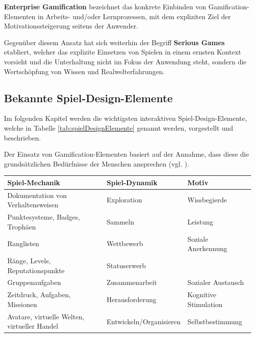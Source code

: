 \documentclass[bibliography=totoc,listof=totoc,BCOR=5mm,DIV=12,oneside]{scrbook}
\begin{document}
\par \bigskip \textbf{Enterprise Gamification} bezeichnet das konkrete Einbinden von Gamification-Elementen in Arbeits- und/oder Lernprozessen, mit dem expliziten Ziel der Motivationssteigerung seitens der Anwender.
\par \bigskip Gegenüber diesem Ansatz hat sich weiterhin der Begriff \textbf{Serious Games} etabliert, welcher das explizite Einsetzen von Spielen in einem ernsten Kontext vorsieht und die Unterhaltung nicht im Fokus der Anwendung steht, sondern die Wertschöpfung von Wissen und Realwelterfahrungen. 

\newpage
\subsection{Bekannte Spiel-Design-Elemente} \label{sub:grundlagenSpielDesignElemente}

\par Im folgenden Kapitel werden die wichtigsten interaktiven Spiel-Design-Elemente, welche in Tabelle \ref{tab:spielDesignElemente} genannt werden, vorgestellt und beschrieben. 
\par Der Einsatz von Gamification-Elementen basiert auf der Annahme, dass diese die grundsätzlichen Bedürfnisse der Menschen ansprechen (vgl. \citep[Kapitel 1.1 Enterprise Gamification - Vorgehen und Anwendung, Seite 5]{Sailer2016}).

\bigskip
\begin{tabularx}{\textwidth}{X|l|l}
	\toprule
	\textbf{Spiel-Mechanik} & \textbf{Spiel-Dynamik} & \textbf{Motiv}\\ \midrule
	Dokumentation von Verhaltensweisen & Exploration & Wissbegierde\\
	Punktesysteme, Badges, Trophäen & Sammeln  & Leistung\\
	Ranglisten & Wettbewerb & Soziale Anerkennung\\ 
	Ränge, Levels, Reputationspunkte & Statuserwerb  & \\
	Gruppenaufgaben & Zusammenarbeit  & Sozialer Austausch\\
	Zeitdruck, Aufgaben, Missionen & Herausforderung & Kognitive Stimulation\\ 
	Avatare, virtuelle Welten, virtueller Handel & Entwickeln/Organisieren & Selbstbestimmung \\ 
	\bottomrule
\end{tabularx}
\label{tab:spielDesignElemente}
\end{document}
